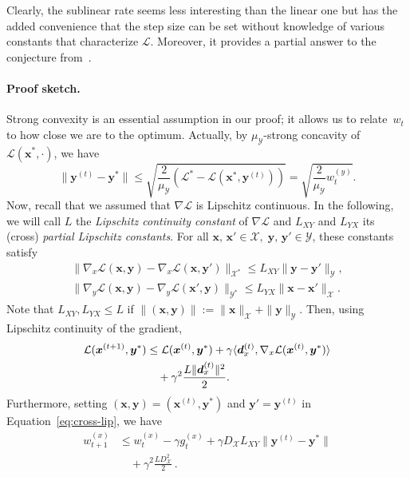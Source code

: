 \documentclass[twoside]{article}
\renewcommand{\L}{\mathcal{L}}
\newcommand{\X}{\mathcal{X}}
\newcommand{\Y}{\mathcal{Y}}
\newcommand{\x}{\bm{x}}
\newcommand{\y}{\bm{y}}
\newcommand{\xt}{\bm{x}^{(t)}}
\newcommand{\xtt}{\bm {x}^{(t+1)}}
\newcommand{\dt}{\bm{d}^{(t)}}
\newcommand{\yt}{\bm{y}^{(t)}}
\newcommand{\stepsize}{\gamma}
\newcommand{\innerProdCompressed}[2]{\langle #1 , #2 \rangle}
\newcommand{\0}{\mathbf{0}} %
\begin{document}
Clearly, the sublinear rate seems less interesting than the linear one but has the added convenience that the step size can be set without knowledge of various constants that characterize $\L$.  Moreover, it provides a partial answer to the conjecture from~\citet{hammond1984solving}.

%
%
%



\paragraph{Proof sketch.} %
\label{par:proof_sketch}

%

%
Strong convexity is an essential assumption in our proof; it allows us to relate~$w_t$ to how close we are to the optimum. 
Actually, by $\mu_\Y$-strong concavity of $\L(\x^*,\cdot)$, we have
\begingroup
\setlength{\thinmuskip}{0.5mu}
\setlength{\medmuskip}{0mu}
\setlength{\thickmuskip}{0.5mu}
\begin{equation}\label{eq:close_y_w}
   \| \yt - \y^*\| \leq \sqrt{\frac{2}{\mu_\Y} \left( \L^*  - \L(\x^*,\yt)\right)} = \sqrt{\frac{2}{\mu_\Y} w_t^{(y)}}.
 \end{equation}
\endgroup
Now, recall that we assumed that $\nabla \L$ is Lipschitz continuous. In the following, we will call $L$ the {\em Lipschitz continuity constant} of $\nabla \L$ and $L_{XY}$ and $L_{YX}$ its (cross) {\em  partial Lipschitz constants}. For all $\x, \, \x' \in \X, \;\y, \, \y'  \in \Y$, these constants satisfy
\begin{equation}
\begin{aligned}\label{eq:cross-lip}
   \!\! \|\nabla_x\L(\x,\y) - \nabla_x\L(\x,\y')\|_{\X^*} \leq L_{XY} \|\y- \y'\|_\Y,\\
   \!\! \|\nabla_y\L(\x,\y) - \nabla_y\L(\x',\y)\|_{\Y^*} \leq L_{YX} \|\x- \x'\|_\X.
\end{aligned}
\end{equation}
Note that $L_{XY},L_{YX}\leq L$ if $\|(\x,\y)\| := \|\x\|_\X + \|\y\|_\Y$.
Then, using Lipschitz continuity of the gradient,
%
%
%
%
%
\begin{align}
 \L(\xtt,\y^*)  & \leq  \L(\xt,\y^*)  +  \stepsize \innerProdCompressed{\dt_x}{\nabla_x \L(\xt,\y^*)} \notag \\
                  & \quad+ \stepsize^2 \frac{L \|\dt_x\|^2}{2}.
\end{align}
%
Furthermore, setting $(\x,\y) = (\xt, \y^*)$ and $\y'= \yt$ in Equation~\eqref{eq:cross-lip}, we have
\begin{equation}
\begin{aligned}\label{eq:intermediary_scheme}
 w_{t+1}^{(x)} & \leq w_t^{(x)} 
                  - \stepsize g_t^{(x)} 
                  + \stepsize D_\X L_{XY} \|\yt - \y^*\| \\
                 & \quad + \stepsize^2 \frac{L D_\X^2}{2} \, .
\end{aligned}
\end{equation}
\end{document}
